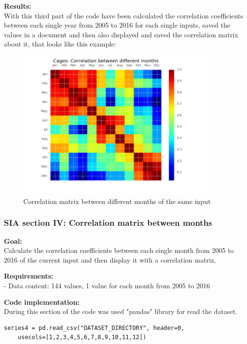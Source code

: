 \begin{minipage}{0.5\textwidth}
\textbf{Results:} \\
With this third part of the code have been calculated the correlation coefficients between each single year from 2005 to 2016 for each single inputs, saved the values in a document and then also displayed and saved the correlation matrix about it, that looks like this example:
\end{minipage} \hfill
\begin{minipage}{0.45\textwidth}
\begin{figure}[H]
    \includegraphics[width=0.9\textwidth]{Files/Cages_Months_Matrix.jpg}
    \caption{Correlation matrix between different months of the same input}
\end{figure}
\end{minipage}



\newpage
\subsubsection{SIA section IV: Correlation matrix between months}

\textbf{Goal:}\\
Calculate the correlation coefficients between each single month from 2005 to 2016 of the current input and then display it with a correlation matrix.

\textbf{Requirements:}\\
- Data content: 144 values, 1 value for each month from 2005 to 2016

\textbf{Code implementation:}\\
During this section of the code was used "pandas" library for read the dataset.
\begin{lstlisting}
series4 = pd.read_csv("DATASET_DIRECTORY", header=0, 
	usecols=[1,2,3,4,5,6,7,8,9,10,11,12])
\end{lstlisting}

